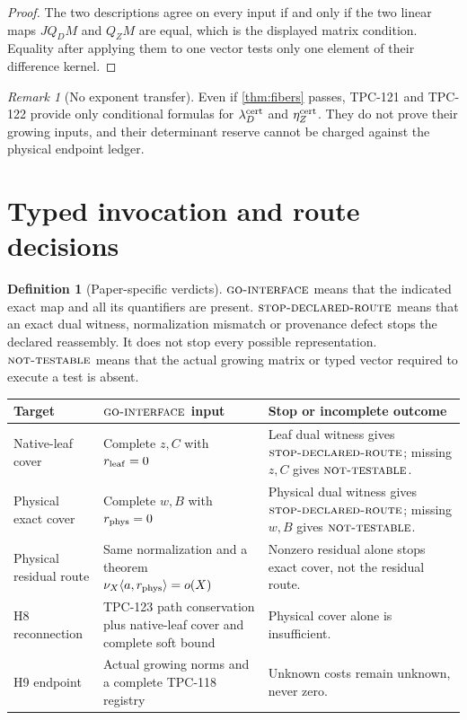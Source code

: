 \documentclass[11pt]{article}
\theoremstyle{definition}
\newtheorem{definition}[theorem]{Definition}
\theoremstyle{remark}
\newtheorem{remark}[theorem]{Remark}
\newcommand{\GOI}{\textsc{go-interface}}
\newcommand{\STOP}{\textsc{stop-declared-route}}
\newcommand{\NT}{\textsc{not-testable}}
\begin{document}
\begin{proof}
The two descriptions agree on every input if and only if the two
linear maps \(JQ_DM\) and \(Q_ZM\) are equal, which is the displayed
matrix condition.  Equality after applying them to one vector tests
only one element of their difference kernel.
\end{proof}

\begin{remark}[No exponent transfer]
Even if \cref{thm:fibers} passes, TPC-121 and TPC-122 provide only
conditional formulas for \(\lambda_D^{\rm cert}\) and
\(\eta_Z^{\rm cert}\).  They do not prove their growing inputs, and
their determinant reserve cannot be charged against the physical
endpoint ledger.
\end{remark}

\section{Typed invocation and route decisions}

\begin{definition}[Paper-specific verdicts]
\(\GOI\) means that the indicated exact map and all its quantifiers
are present.  \(\STOP\) means that an exact dual witness,
normalization mismatch or provenance defect stops the declared
reassembly.  It does not stop every possible representation.
\(\NT\) means that the actual growing matrix or typed vector required
to execute a test is absent.
\end{definition}

\begin{center}
\small
\begin{tabularx}{\textwidth}{@{}P{0.22\textwidth}P{0.31\textwidth}Y@{}}
\toprule
Target & \(\GOI\) input & Stop or incomplete outcome\\
\midrule
Native-leaf cover
& Complete \(z,C\) with \(r_{\rm leaf}=0\)
& Leaf dual witness gives \(\STOP\); missing \(z,C\) gives \(\NT\).\\
Physical exact cover
& Complete \(w,B\) with \(r_{\rm phys}=0\)
& Physical dual witness gives \(\STOP\); missing \(w,B\) gives \(\NT\).\\
Physical residual route
& Same normalization and a theorem
\(\nu_X\langle a,r_{\rm phys}\rangle=o(X)\)
& Nonzero residual alone stops exact cover, not the residual route.\\
H8 reconnection
& TPC-123 path conservation plus native-leaf cover and complete soft
bound
& Physical cover alone is insufficient.\\
H9 endpoint
& Actual growing norms and a complete TPC-118 registry
& Unknown costs remain unknown, never zero.\\
\bottomrule
\end{tabularx}
\end{center}
\end{document}

